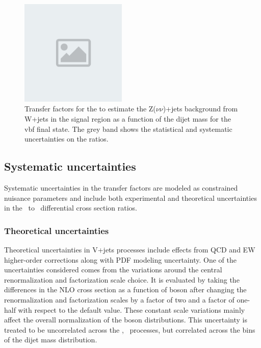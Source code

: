 \begin{figure}[htbp]
  \centering
  \includegraphics[width=0.45\textwidth]{placeholder.png}
  \caption{Transfer factors for the to estimate the Z($\nu\nu$)+jets background from W+jets in the signal region as a function of the dijet mass for the vbf final state. The grey band shows the statistical and systematic uncertainties on the ratios.}
  \label{fig:WZ_SF_vbf}
\end{figure}

\subsection{Systematic uncertainties}

Systematic uncertainties in the transfer factors are 
modeled as constrained nuisance parameters and include both
experimental and theoretical uncertainties
in the \Wjets~to \Zjets~differential cross section ratios. 

\subsubsection{Theoretical uncertainties}

Theoretical uncertainties in V+jets processes include effects from QCD and EW higher-order
corrections along with PDF modeling uncertainty. One of the uncertainties considered comes from the 
variations around the central renormalization and factorization scale choice. It is evaluated by taking the differences in the NLO cross 
section as a function of boson \pt after changing the renormalization and factorization scales by a factor of two and a factor 
of one-half with respect to the default value. These constant scale variations mainly affect the 
overall normalization of the boson \pt distributions. This uncertainty is treated to be uncorrelated 
across the \Zjets, \Wjets~processes, but correlated across the bins of the dijet mass distribution. 

